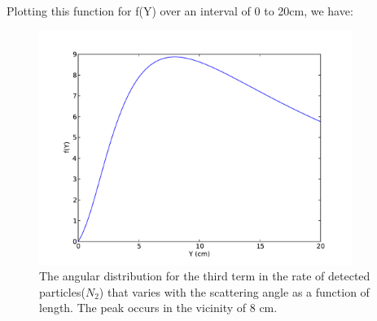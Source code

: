 Plotting this function for f(Y) over an interval of 0 to 20cm, we have:
\begin{figure}[h!]
\begin{center}
\includegraphics[width=4in]{preliminary_plot.pdf}
\caption{The angular distribution for the third term in the rate of detected particles($N_2$) that varies with the scattering angle as a function of length. The peak occurs in the vicinity of 8 cm.}
\end{center}
\end{figure}

